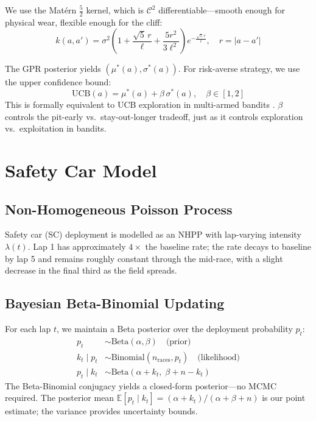 \documentclass[11pt, a4paper, twocolumn]{article}
\numberwithin{equation}{section}
\theoremstyle{definition}
\newcommand{\E}{\mathbb{E}}
\newcommand{\lap}{t}
\newcommand{\age}{a}
\begin{document}
We use the Mat\'{e}rn $\tfrac{5}{2}$ kernel, which is $\mathcal{C}^2$
differentiable---smooth enough for physical wear, flexible enough for the cliff:
\begin{equation}
  k(\age,\age') = \sigma^2\!\left(1 + \frac{\sqrt{5}\,r}{\ell}
  + \frac{5r^2}{3\ell^2}\right)e^{-\frac{\sqrt{5}\,r}{\ell}},
  \quad r = |\age - \age'|
\end{equation}

The GPR posterior yields $(\mu^*(\age), \sigma^*(\age))$. For risk-averse
strategy, we use the upper confidence bound:
\begin{equation}
  \text{UCB}(\age) = \mu^*(\age) + \beta\,\sigma^*(\age), \quad \beta \in [1, 2]
  \label{eq:ucb}
\end{equation}
This is formally equivalent to UCB exploration in multi-armed bandits
\cite{auer2002}. $\beta$ controls the pit-early vs.\ stay-out-longer tradeoff,
just as it controls exploration vs.\ exploitation in bandits.

\section{Safety Car Model}

\subsection{Non-Homogeneous Poisson Process}

Safety car (SC) deployment is modelled as an NHPP with lap-varying intensity
$\lambda(\lap)$. Lap 1 has approximately $4\times$ the baseline rate; the rate
decays to baseline by lap 5 and remains roughly constant through the mid-race,
with a slight decrease in the final third as the field spreads.

\subsection{Bayesian Beta-Binomial Updating}

For each lap $\lap$, we maintain a Beta posterior over the deployment
probability $p_\lap$:
\begin{align}
  p_\lap &\sim \text{Beta}(\alpha, \beta) \quad \text{(prior)} \\
  k_\lap \mid p_\lap &\sim \text{Binomial}(n_{\text{races}}, p_\lap) \quad \text{(likelihood)} \\
  p_\lap \mid k_\lap &\sim \text{Beta}(\alpha + k_\lap,\; \beta + n - k_\lap)
  \label{eq:bayes_sc}
\end{align}
The Beta-Binomial conjugacy yields a closed-form posterior---no MCMC required.
The posterior mean $\E[p_\lap \mid k_\lap] = (\alpha+k_\lap)/(\alpha+\beta+n)$
is our point estimate; the variance provides uncertainty bounds.
\end{document}
